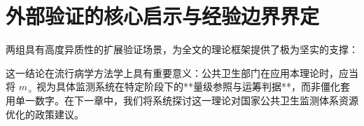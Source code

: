 \section{外部验证的核心启示与经验边界界定}\label{sec:ext_summary}

两组具有高度异质性的扩展验证场景，为全文的理论框架提供了极为坚实的支撑：
\begin{center}
\end{center}
这一结论在流行病学方法学上具有重要意义：公共卫生部门在应用本理论时，应当将 $m_\times$ 视为具体监测系统在特定阶段下的**量级参照与运筹判据**，而非僵化套用单一数字。在下一章中，我们将系统探讨这一理论对国家公共卫生监测体系资源优化的政策建议。
